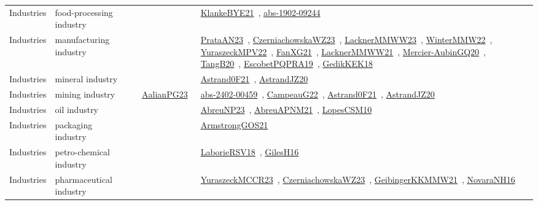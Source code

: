 {\begin{longtable}{lp{3cm}>{\raggedright\arraybackslash}p{6cm}>{\raggedright\arraybackslash}p{6cm}>{\raggedright\arraybackslash}p{8cm}}
Industries & food-processing industry &  &  & \href{works/KlankeBYE21.pdf}{KlankeBYE21}~\cite{KlankeBYE21}, \href{works/abs-1902-09244.pdf}{abs-1902-09244}~\cite{abs-1902-09244}\\
Industries & manufacturing industry &  &  & \href{works/PrataAN23.pdf}{PrataAN23}~\cite{PrataAN23}, \href{works/CzerniachowskaWZ23.pdf}{CzerniachowskaWZ23}~\cite{CzerniachowskaWZ23}, \href{works/LacknerMMWW23.pdf}{LacknerMMWW23}~\cite{LacknerMMWW23}, \href{works/WinterMMW22.pdf}{WinterMMW22}~\cite{WinterMMW22}, \href{works/YuraszeckMPV22.pdf}{YuraszeckMPV22}~\cite{YuraszeckMPV22}, \href{works/FanXG21.pdf}{FanXG21}~\cite{FanXG21}, \href{works/LacknerMMWW21.pdf}{LacknerMMWW21}~\cite{LacknerMMWW21}, \href{works/Mercier-AubinGQ20.pdf}{Mercier-AubinGQ20}~\cite{Mercier-AubinGQ20}, \href{works/TangB20.pdf}{TangB20}~\cite{TangB20}, \href{works/EscobetPQPRA19.pdf}{EscobetPQPRA19}~\cite{EscobetPQPRA19}, \href{works/GedikKEK18.pdf}{GedikKEK18}~\cite{GedikKEK18}\\
Industries & mineral industry &  &  & \href{works/Astrand0F21.pdf}{Astrand0F21}~\cite{Astrand0F21}, \href{works/AstrandJZ20.pdf}{AstrandJZ20}~\cite{AstrandJZ20}\\
Industries & mining industry &  & \href{works/AalianPG23.pdf}{AalianPG23}~\cite{AalianPG23} & \href{works/abs-2402-00459.pdf}{abs-2402-00459}~\cite{abs-2402-00459}, \href{works/CampeauG22.pdf}{CampeauG22}~\cite{CampeauG22}, \href{works/Astrand0F21.pdf}{Astrand0F21}~\cite{Astrand0F21}, \href{works/AstrandJZ20.pdf}{AstrandJZ20}~\cite{AstrandJZ20}\\
Industries & oil industry &  &  & \href{works/AbreuNP23.pdf}{AbreuNP23}~\cite{AbreuNP23}, \href{works/AbreuAPNM21.pdf}{AbreuAPNM21}~\cite{AbreuAPNM21}, \href{works/LopesCSM10.pdf}{LopesCSM10}~\cite{LopesCSM10}\\
Industries & packaging industry &  &  & \href{works/ArmstrongGOS21.pdf}{ArmstrongGOS21}~\cite{ArmstrongGOS21}\\
Industries & petro-chemical industry &  &  & \href{works/LaborieRSV18.pdf}{LaborieRSV18}~\cite{LaborieRSV18}, \href{works/GilesH16.pdf}{GilesH16}~\cite{GilesH16}\\
Industries & pharmaceutical industry &  &  & \href{works/YuraszeckMCCR23.pdf}{YuraszeckMCCR23}~\cite{YuraszeckMCCR23}, \href{works/CzerniachowskaWZ23.pdf}{CzerniachowskaWZ23}~\cite{CzerniachowskaWZ23}, \href{works/GeibingerKKMMW21.pdf}{GeibingerKKMMW21}~\cite{GeibingerKKMMW21}, \href{works/NovaraNH16.pdf}{NovaraNH16}~\cite{NovaraNH16}\\

\end{longtable}}
